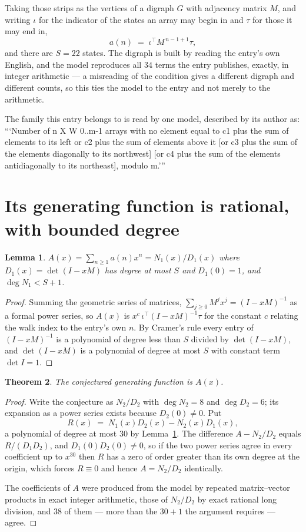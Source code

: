 \documentclass[11pt,a4paper]{article}
\theoremstyle{plain}
\newtheorem{theorem}{Theorem}
\newtheorem{lemma}[theorem]{Lemma}
\theoremstyle{definition}
\begin{document}
Taking those strips as the vertices of a digraph $G$ with adjacency matrix $M$, and writing
$\iota$ for the indicator of the states an array may begin in and $\tau$ for those it may end
in,
\[
a(n)\;=\;\iota^{\!\top}M^{\,n-1+1}\tau ,
\]
and there are $S=22$ states. The digraph is built by reading the entry's own English, and the
model reproduces all $34$ terms the entry publishes, exactly, in integer arithmetic --- a
misreading of the condition gives a different digraph and different counts, so this ties the
model to the entry and not merely to the arithmetic.

The family this entry belongs to is read by one model, described by its author as: ```Number of n X W 0..m-1 arrays with no element equal to c1 plus the sum of elements to its left or c2 plus the sum of elements above it [or c3 plus the sum of the elements diagonally to its northwest] [or c4 plus the sum of the elements antidiagonally to its northeast], modulo m.'''


\section{Its generating function is rational, with bounded degree}

\begin{lemma}\label{lem:rat}
$A(x)=\sum_{n\ge1}a(n)x^n=N_1(x)/D_1(x)$ where $D_1(x)=\det(I-xM)$ has degree at most
$S$ and $D_1(0)=1$, and $\deg N_1<S+1$.
\end{lemma}

\begin{proof}
Summing the geometric series of matrices, $\sum_{j\ge0}M^jx^j=(I-xM)^{-1}$ as a formal
power series, so $A(x)$ is $x^{c}\,\iota^{\!\top}(I-xM)^{-1}\tau$ for the constant $c$
relating the walk index to the entry's own $n$. By Cramer's rule every entry of
$(I-xM)^{-1}$ is a polynomial of degree less than $S$ divided by $\det(I-xM)$, and
$\det(I-xM)$ is a polynomial of degree at most $S$ with constant term $\det I=1$.
\end{proof}

\begin{theorem}
The conjectured generating function is $A(x)$.
\end{theorem}

\begin{proof}
Write the conjecture as $N_2/D_2$ with $\deg N_2=8$ and $\deg D_2=6$; its expansion as a
power series exists because $D_2(0)\neq0$. Put
\[
R(x)\;=\;N_1(x)D_2(x)-N_2(x)D_1(x),
\]
a polynomial of degree at most $30$ by Lemma~\ref{lem:rat}. The difference
$A-N_2/D_2$ equals $R/(D_1D_2)$, and $D_1(0)D_2(0)\neq0$, so if the two power series agree in
every coefficient up to $x^{30}$ then $R$ has a zero of order greater than its own
degree at the origin, which forces $R\equiv0$ and hence $A=N_2/D_2$ identically.

The coefficients of $A$ were produced from the model by repeated matrix--vector products in
exact integer arithmetic, those of $N_2/D_2$ by exact rational long division, and $38$
of them --- more than the $30+1$ the argument requires --- agree.
\end{proof}
\end{document}
